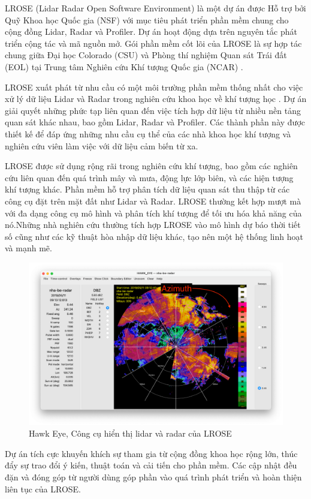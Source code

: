 LROSE (Lidar Radar Open Software Environment) là một dự án được Hỗ trợ bởi Quỹ Khoa học Quốc gia (NSF) với mục tiêu phát triển phần mềm chung cho cộng đồng Lidar, Radar và Profiler. Dự án hoạt động dựa trên nguyên tắc phát triển cộng tác và mã nguồn mở. Gói phần mềm cốt lõi của LROSE là sự hợp tác chung giữa Đại học Colorado (CSU) và Phòng thí nghiệm Quan sát Trái đất (EOL) tại Trung tâm Nghiên cứu Khí tượng Quốc gia (NCAR) \cite{lrose}.

LROSE xuất phát từ nhu cầu có một môi trường phần mềm thống nhất cho việc xử lý dữ liệu Lidar và Radar trong nghiên cứu khoa học về khí tượng học \cite{lrose}.
Dự án giải quyết những phức tạp liên quan đến việc tích hợp dữ liệu từ nhiều nền tảng quan sát khác nhau, bao gồm Lidar, Radar và Profiler. Các thành phần này được thiết kế để đáp ứng những nhu cầu cụ thể của các nhà khoa học khí tượng và nghiên cứu viên làm việc với dữ liệu cảm biến từ xa.

LROSE được sử dụng rộng rãi trong nghiên cứu khí tượng, bao gồm các nghiên cứu liên quan đến quá trình mây và mưa, động lực lớp biên, và các hiện tượng khí tượng khác. Phần mềm hỗ trợ phân tích dữ liệu quan sát thu thập từ các công cụ đặt trên mặt đất như Lidar và Radar. LROSE thường kết hợp mượt mà với đa dạng công cụ mô hình và phân tích khí tượng để tối ưu hóa khả năng của nó.Những nhà nghiên cứu thường tích hợp LROSE vào mô hình dự báo thời tiết số cũng như các kỹ thuật hòa nhập dữ liệu khác, tạo nên một hệ thống linh hoạt và mạnh mẽ.

\begin{figure}[H]
    \centering
    \includegraphics[width=0.8\linewidth]{Images/3.5-hawk-eye.png}
    \caption{Hawk Eye, Công cụ hiển thị lidar và radar của LROSE}
    \label{fig:hawk-eye}
\end{figure}

Dự án tích cực khuyến khích sự tham gia từ cộng đồng khoa học rộng lớn, thúc đẩy sự trao đổi ý kiến, thuật toán và cải tiến cho phần mềm.
Các cập nhật đều đặn và đóng góp từ người dùng góp phần vào quá trình phát triển và hoàn thiện liên tục của LROSE.